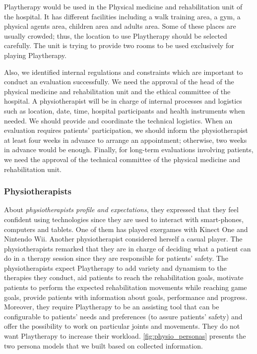 Playtherapy would be used in the Physical medicine and rehabilitation unit of the hospital. It has different facilities including a walk training area, a gym, a physical agents area, children area and adults area. Some of these places are usually crowded; thus, the location to use Playtherapy should be selected carefully. The unit is trying to provide two rooms to be used exclusively for playing Playtherapy.

Also, we identified internal regulations and constraints which are important to conduct an evaluation successfully. We need the approval of the head of the physical medicine and rehabilitation unit and the ethical committee of the hospital. A physiotherapist will be in charge of internal processes and logistics such as location, date, time, hospital participants and health instruments when needed. We should provide and coordinate the technical logistics.  When an evaluation requires patients' participation, we should inform the physiotherapist at least four weeks in advance to arrange an appointment; otherwise, two weeks in advance would be enough. Finally, for long-term evaluations involving patients, we need the approval of the technical committee of the physical medicine and rehabilitation unit.

\subsubsection{Physiotherapists}
About \emph{physiotherapists profile and expectations}, they expressed that they feel confident using technologies since they are used to interact with smart-phones, computers and tablets. One of them has played exergames with Kinect One and Nintendo Wii. Another physiotherapist considered herself a casual player. The physiotherapists remarked that they are in charge of deciding what a patient can do in a therapy session since they are responsible for patients' safety. The physiotherapists expect Playtherapy to add variety and dynamism to the therapies they conduct, aid patients to reach the rehabilitation goals, motivate patients to perform the expected rehabilitation movements while reaching game goals, provide patients with information about goals, performance and progress. Moreover, they require Playtherapy to be an assisting tool that can be configurable to patients' needs and preferences (to assure patients' safety) and offer the possibility to work on particular joints and movements. They do not want Playtherapy to increase their workload. \autoref{fig:physio_personas} presents the two persona models that we built based on collected information.

